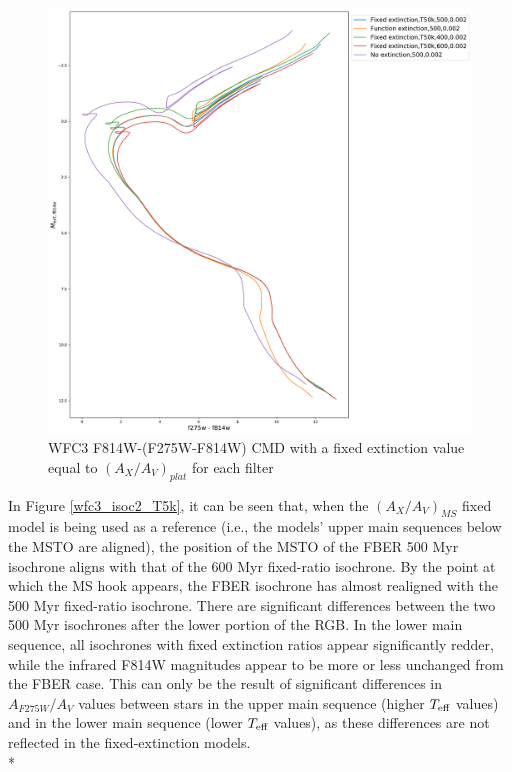 \documentclass[12pt, a4paper]{report}
\begin{document}
\begin{figure}[h]
\begin{center}
\includegraphics[width=1.0\textwidth]{../basti_isochrones_10_13Gyr/Extinction_T50k_FeH0fix_func_f814w_f275wmf814w_500_400_600_Myr_FeH_0p002_ref_noext_Av_1p0.pdf}
\caption{WFC3 F814W-(F275W-F814W) CMD with a fixed extinction value equal to $(A_{X}/A_{V})_{plat}$ for each filter}
\label{wfc3_isoc2_T50k}
\end{center}
\end{figure}

In Figure \ref{wfc3_isoc2_T5k}, it can be seen that, when the $(A_{X}/A_{V})_{MS}$ fixed model is being used as a reference (i.e., the models' upper main sequences below the MSTO are aligned), the position of the MSTO of the FBER 500 Myr isochrone aligns with that of the 600 Myr fixed-ratio isochrone. By the point at which the MS hook \citep{1998MNRAS.298..525P} appears, the FBER isochrone has almost realigned with the 500 Myr fixed-ratio isochrone. There are significant differences between the two 500 Myr isochrones after the lower portion of the RGB. In the lower main sequence, all isochrones with fixed extinction ratios appear significantly redder, while the infrared F814W magnitudes appear to be more or less unchanged from the FBER case. This can only be the result of significant differences in $A_{F275W}/A_{V}$ values between stars in the upper main sequence (higher $T_{\textnormal{eff}}$ values) and in the lower main sequence (lower $T_{\textnormal{eff}}$ values), as these differences are not reflected in the fixed-extinction models. \\*
\end{document}

